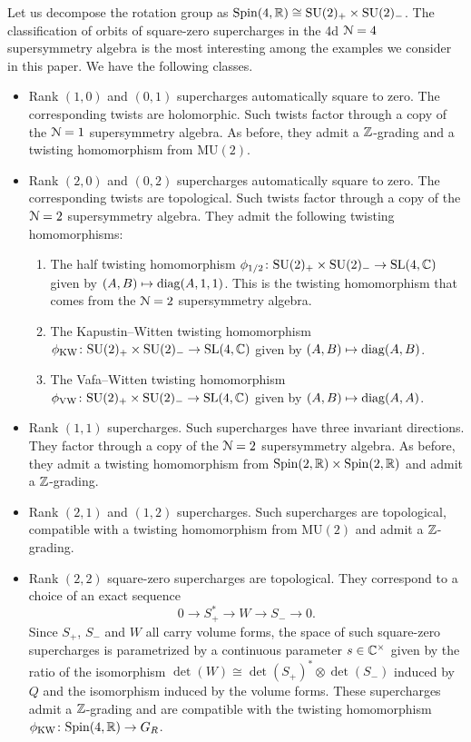 \documentclass[10pt, oneside]{article}
\newcommand{\MU}{\mathrm{MU}}
\begin{document}
Let us decompose the rotation group as $\mathrm{Spin}(4, \mathbb R)\cong \mathrm{SU}(2)_+\times \mathrm{SU}(2)_-$. The classification of orbits of square-zero supercharges in the 4d $\mathcal{N}=4$ supersymmetry algebra is the most interesting among the examples we consider in this paper. We have the following classes. 
\begin{itemize}
\item Rank $(1,0)$ and $(0,1)$ supercharges automatically square to zero. The corresponding twists are holomorphic. Such twists factor through a copy of the $\mathcal N = 1$ supersymmetry algebra. As before, they admit a $\mathbb Z$-grading and a twisting homomorphism from $\MU(2)$.

\item Rank $(2, 0)$ and $(0, 2)$ supercharges automatically square to zero. The corresponding twists are topological. Such twists factor through a copy of the $\mathcal N = 2$ supersymmetry algebra. They admit the following twisting homomorphisms:
 \begin{enumerate}
  \item The half twisting homomorphism $\phi_{\mathrm{1/2}} \colon \mathrm{SU}(2)_+ \times \mathrm{SU}(2)_- \to \mathrm{SL}(4,\mathbb C)$ given by $(A,B) \mapsto \mathrm{diag}(A, 1, 1)$. This is the twisting homomorphism that comes from the $\mathcal N=2$ supersymmetry algebra.
  \item The Kapustin--Witten twisting homomorphism $\phi_{\mathrm{KW}} \colon \mathrm{SU}(2)_+ \times \mathrm{SU}(2)_- \to \mathrm{SL}(4,\mathbb C)$ given by $(A,B) \mapsto \mathrm{diag}(A, B)$.
  \item The Vafa--Witten twisting homomorphism $\phi_{\mathrm{VW}} \colon \mathrm{SU}(2)_+ \times \mathrm{SU}(2)_- \to \mathrm{SL}(4, \mathbb C)$ given by $(A,B) \mapsto \mathrm{diag}(A, A)$.
 \end{enumerate}
 
 \item Rank $(1,1)$ supercharges.  Such supercharges have three invariant directions. They factor through a copy of the $\mathcal N=2$ supersymmetry algebra. As before, they admit a twisting homomorphism from $\mathrm{Spin}(2, \mathbb R)\times \mathrm{Spin}(2, \mathbb R)$ and admit a $\mathbb Z$-grading.

 \item Rank $(2,1)$ and $(1,2)$ supercharges.  Such supercharges are topological, compatible with a twisting homomorphism from $\MU(2)$ and admit a $\mathbb Z$-grading.
 
 \item Rank $(2,2)$ square-zero supercharges are topological. They correspond to a choice of an exact sequence
 \[0\rightarrow S_+^*\rightarrow W\rightarrow S_-\rightarrow 0.\]
 Since $S_+$, $S_-$ and $W$ all carry volume forms, the space of such square-zero supercharges is parametrized by a continuous parameter $s\in\mathbb C^\times$ given by the ratio of the isomorphism $\det(W)\cong \det(S_+)^*\otimes \det(S_-)$ induced by $Q$ and the isomorphism induced by the volume forms. These supercharges admit a $\mathbb Z$-grading and are compatible with the twisting homomorphism $\phi_{\mathrm{KW}}\colon \mathrm{Spin}(4, \mathbb R)\rightarrow G_R$.
\end{itemize}
\end{document}
